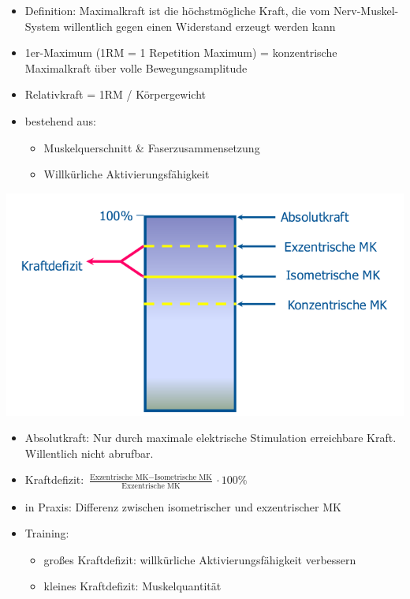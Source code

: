 \begin{minipage}{0.5\textwidth}
\begin{itemize}
    \item Definition: Maximalkraft ist die höchstmögliche Kraft, die vom Nerv-Muskel-System willentlich gegen einen Widerstand erzeugt werden kann
    \item 1er-Maximum (1RM = 1 Repetition Maximum) = konzentrische Maximalkraft über volle Bewegungsamplitude
    \item Relativkraft = 1RM / Körpergewicht
    \item bestehend aus:
    \begin{itemize}
        \item Muskelquerschnitt \& Faserzusammensetzung
        \item Willkürliche Aktivierungsfähigkeit
    \end{itemize}
\end{itemize}
\end{minipage}
\begin{minipage}{0.5\textwidth}
\includegraphics[width=1.1\textwidth]{pictures/maximalkraftvarianten}
\end{minipage}

\begin{itemize}
    \item Absolutkraft: Nur durch maximale elektrische Stimulation erreichbare Kraft. Willentlich nicht abrufbar.
    \item Kraftdefizit: $\frac{\text{Exzentrische MK} - \text{Isometrische MK}}{\text{Exzentrische MK}} \cdot 100 \%$
    \item in Praxis: Differenz zwischen isometrischer und exzentrischer MK
    \item Training:
    \begin{itemize}
        \item großes Kraftdefizit: willkürliche Aktivierungsfähigkeit verbessern
        \item kleines Kraftdefizit: Muskelquantität
    \end{itemize}
\end{itemize}

